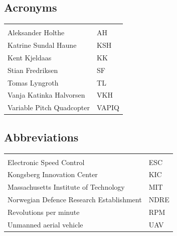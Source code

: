 \documentclass{article}
\begin{document}
\vspace*{3.0 cm}

\begin{center}
\section*{\textbf{Acronyms}}
\begin{tabular}{ll}
\rowcolor{cadetgrey}
    &   \\
Aleksander Holthe      & AH     
 \\\rowcolor{gainsboro}
Katrine Sundal Haune  & KSH \\
Kent Kjeldaas         & KK 
 \\\rowcolor{gainsboro}
Stian Fredriksen      & SF  \\
Tomas Lyngroth       & TL   
 \\\rowcolor{gainsboro}
Vanja Katinka Halvorsen     & VKH   \\
Variable Pitch Quadcopter   & VAPIQ
\end{tabular}                                                             
\end{center}

\vspace*{2.0 cm}

\begin{center}
\section*{\textbf{Abbreviations}}
\begin{tabular}{ll}
\rowcolor{cadetgrey}
    &   \\
Electronic Speed Control      & ESC          \\\rowcolor{gainsboro}
Kongsberg Innovation Center & KIC \\
Massachusetts Institute of Technology       & MIT
\\\rowcolor{gainsboro}
Norwegian Defence Research Establishment   & NDRE \\
Revolutions per minute      & RPM         
\\\rowcolor{gainsboro}
Unmanned aerial vehicle     & UAV   \\
\end{tabular}                                                             
\end{center}
\newpage


%

\tableofcontents
\listoffigures
\newpage



\newpage


\newpage


\newpage


\newpage


\newpage


%
\end{document}
